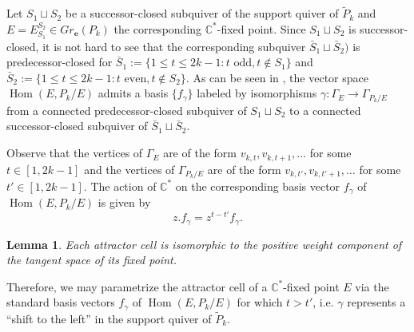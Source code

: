 \documentclass{amsart}
\newtheorem{lemma}[theorem]{Lemma}
\numberwithin{equation}{section}
\newcommand{\CC}{\mathbb{C}}
\newcommand{\bfe}{\mathbf{e}}
\newcommand{\Hom}{\operatorname{Hom}}
\begin{document}
    Let $S_1\sqcup S_2$ be a successor-closed subquiver of the support quiver of $\tilde P_k$ and $E=E_{S_1}^{S_2}\in Gr_\bfe(P_k)$ the corresponding $\CC^*$-fixed point.
    Since $S_1\sqcup S_2$ is successor-closed, it is not hard to see that the corresponding subquiver $\bar{S}_1\sqcup\bar{S}_2)$ is predecessor-closed for $\bar{S}_1:=\{1\le t\le 2k-1:\text{$t$ odd},t\notin S_1\}$ and $\bar{S}_2:=\{1\le t\le 2k-1:\text{$t$ even},t\notin S_2\}$.
    As can be seen in \cite[Prop. 2.0.2]{cerulli irelli-esposito}, the vector space $\Hom(E,P_k/E)$ admits a basis $\{f_\gamma\}$ labeled by isomorphisms $\gamma:\Gamma_E\to\Gamma_{P_k/E}$ from a connected predecessor-closed subquiver of $S_1\sqcup S_2$ to a connected successor-closed subquiver of $\bar{S}_1\sqcup\bar{S}_2$.
 
    Observe that the vertices of $\Gamma_E$ are of the form $v_{k,t},v_{k,t+1},\ldots$ for some $t\in[1,2k-1]$ and the vertices of $\Gamma_{P_k/E}$ are of the form $v_{k,t'},v_{k,t'+1},\ldots$ for some $t'\in[1,2k-1]$.
    The action of $\CC^*$ on the corresponding basis vector $f_\gamma$ of $\Hom(E,P_k/E)$ is given by
    \[z.f_\gamma=z^{t-t'}f_\gamma.\]
 
    \begin{lemma}
      Each attractor cell is isomorphic to the positive weight component of the tangent space of its fixed point.
    \end{lemma}
 
    Therefore, we may parametrize the attractor cell of a $\CC^*$-fixed point $E$ via the standard basis vectors $f_\gamma$ of $\Hom(E,P_k/E)$ for which $t>t'$, i.e. $\gamma$ represents a ``shift to the left'' in the support quiver of $\tilde P_k$.
 
\end{document}
